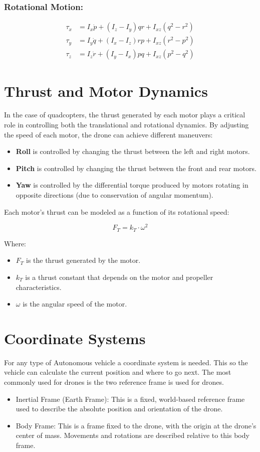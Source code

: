 \documentclass[a4paper,12pt]{report}
\begin{document}
\subsubsection{Rotational Motion:}
\begin{align*}
\tau_x &= I_x \dot{p} + (I_z - I_y) qr + I_{xz}(q^2 - r^2) \\
\tau_y &= I_y \dot{q} + (I_x - I_z) rp + I_{xz}(r^2 - p^2) \\
\tau_z &= I_z \dot{r} + (I_y - I_x) pq + I_{xz}(p^2 - q^2)
\end{align*}

\section{Thrust and Motor Dynamics}
In the case of quadcopters, the thrust generated by each motor plays a critical role in controlling both the translational and rotational dynamics. By adjusting the speed of each motor, the drone can achieve different maneuvers:

\begin{itemize}
    \item \textbf{Roll} is controlled by changing the thrust between the left and right motors.
    \item \textbf{Pitch} is controlled by changing the thrust between the front and rear motors.
    \item \textbf{Yaw} is controlled by the differential torque produced by motors rotating in opposite directions (due to conservation of angular momentum).
\end{itemize}

Each motor's thrust can be modeled as a function of its rotational speed:

\[
F_T = k_T \cdot \omega^2
\]

Where:
\begin{itemize}
    \item $F_T$ is the thrust generated by the motor.
    \item $k_T$ is a thrust constant that depends on the motor and propeller characteristics.
    \item $\omega$ is the angular speed of the motor.
\end{itemize}


\section{Coordinate Systems}
For any type of Autonomous vehicle a coordinate system is needed.
This so the vehicle can calculate the current position and where to go next.
The most commonly used for drones is the two reference frame is used for drones.
\begin{itemize}
    \item Inertial Frame (Earth Frame): This is a fixed, world-based reference frame used to describe the absolute position and orientation of the drone.
    \item Body Frame: This is a frame fixed to the drone, with the origin at the drone’s center of mass. Movements and rotations are described relative to this body frame.
\end{itemize}
\end{document}
